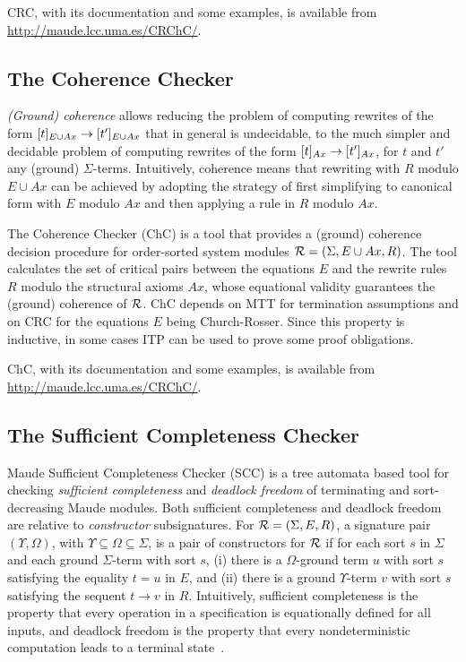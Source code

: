 CRC, with its documentation and some examples, is available from
\url{http://maude.lcc.uma.es/CRChC/}.

\subsection{The Coherence Checker}
\label{sec.chc}

{\em (Ground) coherence} allows reducing the problem of computing rewrites of
the form $[t]_{E\cup Ax} \rightarrow [t']_{E\cup Ax}$ that in general is
undecidable, to the much simpler and decidable problem of computing
rewrites of the form $[t]_{Ax} \rightarrow [t']_{Ax}$, for $t$ and $t'$ 
any (ground) $\Sigma$-terms.
Intuitively, coherence means
that rewriting with $R$ modulo $E\cup Ax$ can be achieved by adopting
the strategy of first simplifying to canonical form with $E$ modulo $Ax$
and then applying a rule in $R$ modulo $Ax$.

The Coherence Checker (ChC) is a tool that provides a
(ground) coherence decision procedure for order-sorted system modules
$\mathcal{R} = (\Sigma,E\cup Ax,R)$. The tool calculates the set of
critical pairs between the equations $E$ and the rewrite rules $R$
modulo the structural axioms $Ax$, 
whose equational validity guarantees the (ground)
coherence of $\mathcal{R}$. ChC depends on MTT for termination
assumptions and on CRC for the equations $E$ being Church-Rosser.
Since this property is inductive, in some cases ITP can be used to
prove some proof obligations.

ChC, with its documentation and some examples, is available from
\url{http://maude.lcc.uma.es/CRChC/}.

\subsection{The Sufficient Completeness Checker}
\label{sec.scc}

Maude Sufficient Completeness Checker (SCC) is a tree automata based tool
for checking {\em sufficient completeness} and {\em deadlock
freedom} of terminating and sort-decreasing Maude modules.
Both sufficient completeness and deadlock freedom are relative
to {\em constructor} subsignatures.
For $\mathcal{R}=(\Sigma,E,R)$, a signature pair $(\Upsilon,\Omega)$,
with $\Upsilon \subseteq \Omega \subseteq \Sigma$, is a pair of
constructors for $\mathcal{R}$ if for each sort $s$ in $\Sigma$ and
each ground $\Sigma$-term with sort $s$, (i) there is a $\Omega$-ground term $u$
with sort $s$ satisfying the equality $t =u$ in $E$,
and (ii) there is a ground $\Upsilon$-term $v$ with sort $s$
satisfying the sequent $t \rightarrow v$ in $R$.
Intuitively, sufficient completeness is the
property that every operation in a specification
is equationally defined for all inputs, and
deadlock freedom is the property that every
nondeterministic computation leads to a terminal 
state~\cite{Rocha-Meseguer:2010,Hendrix:2008}.

